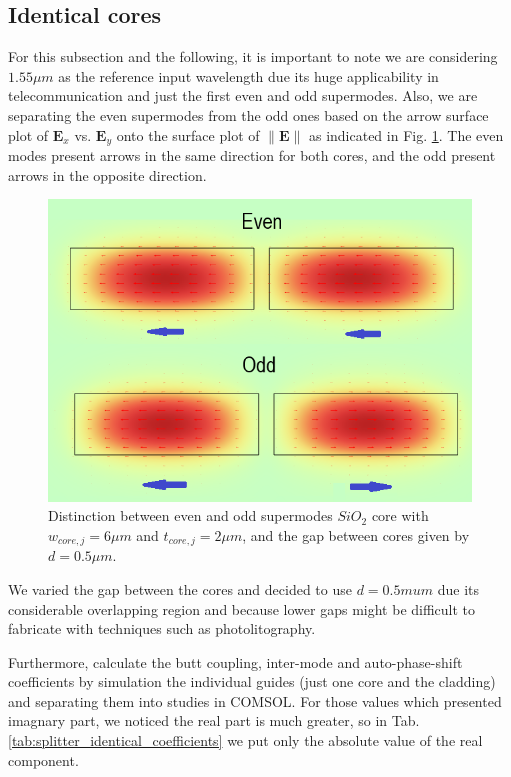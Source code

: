 \documentclass[conference, a4paper]{IEEEtran}
\begin{document}
\subsection{Identical cores}
\label{subsec:splitter_identical}

For this subsection and the following, it is important to note we are considering $1.55\mu m$ as the reference input wavelength due its huge applicability in telecommunication and just the first even and odd supermodes. Also, we are separating the even supermodes from the odd ones based on the arrow surface plot of $\mathbf{E}_x$ vs. $\mathbf{E}_y$ onto the surface plot of $\| \mathbf{E} \|$ as indicated in Fig. \ref{fig:splitter_identical_parity}. The even modes present arrows in the same direction for both cores, and the odd present arrows in the opposite direction.

\begin{figure}[H]
    \centering
    \includegraphics[scale=0.4]{even_odd_supermodes.png}
    \caption{Distinction between even and odd supermodes $SiO_2$ core with $w_{core, j} = 6\mu m$ and $t_{core, j} = 2\mu m$, and the gap between cores given by $d = 0.5\mu m$.}
    \label{fig:splitter_identical_parity}
\end{figure} 

We varied the gap between the cores and decided to use $d = 0.5mu m$ due its considerable overlapping region and because lower gaps might be difficult to fabricate with techniques such as photolitography.

Furthermore, calculate the butt coupling, inter-mode and auto-phase-shift coefficients by simulation the individual guides (just one core and the cladding) and separating them into studies in COMSOL. For those values which presented imagnary part, we noticed the real part is much greater, so in Tab. \ref{tab:splitter_identical_coefficients} we put only the absolute value of the real component.
\end{document}
